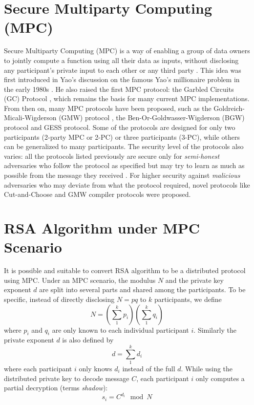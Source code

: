 \section{Secure Multiparty Computing (MPC)}

Secure Multiparty Computing (MPC) is a way of enabling a group of data owners to jointly compute a function using all their data as inputs, without disclosing any participant's private input to each other or any third party \cite{evans_pragmatic_2018}. This idea was first introduced in Yao's discussion on the famous Yao's millionaire problem in the early 1980s \cite{yao_protocols_1982}. He also raised the first MPC protocol: the Garbled Circuits (GC) Protocol \cite{yao_protocols_1982}, which remains the basis for many current MPC implementations. From then on, many MPC protocols have been proposed, such as the Goldreich-Micali-Wigderson (GMW) protocol \cite{goldreich_how_2019}, the Ben-Or-Goldwasser-Wigderson (BGW) \cite{ben-or_completeness_2019} protocol and GESS \cite{kolesnikov_gate_2005} protocol. Some of the protocols are designed for only two participants (2-party MPC or 2-PC) or three participants (3-PC), while others can be generalized to many participants. The security level of the protocols also varies: all the protocols listed previously are secure only for
\textit{semi-honest}
adversaries who follow the protocol as specified but may try to learn as much as possible from the message they received \cite{evans_pragmatic_2018}. For higher security against
\textit{malicious}
adversaries who may deviate from what the protocol required, novel protocols like Cut-and-Choose \cite{chaum_blind_1984} and GMW compiler \cite{goldreich_how_2019} protocols were proposed.

\section{RSA Algorithm under MPC Scenario}

It is possible and suitable to convert RSA algorithm to be a distributed protocol using MPC. Under an MPC scenario, the modulus $N$ and the private key exponent $d$ are split into several parts and shared among the participants. To be specific, instead of directly disclosing $N = pq$ to $k$ participants, we define
\begin{equation}
  N = \left( \sum_1^k p_i\right) \left( \sum_1^k q_i \right)
\end{equation}
where $p_i$ and $q_i$ are only known to each individual participant $i$. Similarly the private exponent $d$ is also defined by
\begin{equation}
  d = \sum_1^k d_i
\end{equation}
where each participant $i$ only knows $d_i$ instead of the full $d$. While using the distributed private key to decode message $C$, each participant $i$ only computes a partial decryption (terms \textit{shadow}):
\begin{equation}
  s_i = C^{d_i}\mod N
\end{equation}

